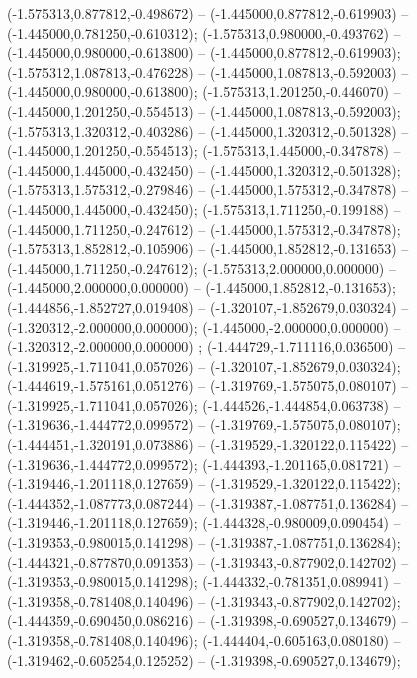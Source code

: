  (-1.575313,0.877812,-0.498672) -- (-1.445000,0.877812,-0.619903) -- (-1.445000,0.781250,-0.610312);
 (-1.575313,0.980000,-0.493762) -- (-1.445000,0.980000,-0.613800) -- (-1.445000,0.877812,-0.619903);
 (-1.575312,1.087813,-0.476228) -- (-1.445000,1.087813,-0.592003) -- (-1.445000,0.980000,-0.613800);
 (-1.575313,1.201250,-0.446070) -- (-1.445000,1.201250,-0.554513) -- (-1.445000,1.087813,-0.592003);
 (-1.575313,1.320312,-0.403286) -- (-1.445000,1.320312,-0.501328) -- (-1.445000,1.201250,-0.554513);
 (-1.575313,1.445000,-0.347878) -- (-1.445000,1.445000,-0.432450) -- (-1.445000,1.320312,-0.501328);
 (-1.575313,1.575312,-0.279846) -- (-1.445000,1.575312,-0.347878) -- (-1.445000,1.445000,-0.432450);
 (-1.575313,1.711250,-0.199188) -- (-1.445000,1.711250,-0.247612) -- (-1.445000,1.575312,-0.347878);
 (-1.575313,1.852812,-0.105906) -- (-1.445000,1.852812,-0.131653) -- (-1.445000,1.711250,-0.247612);
 (-1.575313,2.000000,0.000000) -- (-1.445000,2.000000,0.000000) -- (-1.445000,1.852812,-0.131653);
 (-1.444856,-1.852727,0.019408) -- (-1.320107,-1.852679,0.030324) -- (-1.320312,-2.000000,0.000000);
 (-1.445000,-2.000000,0.000000) -- (-1.320312,-2.000000,0.000000) ;
 (-1.444729,-1.711116,0.036500) -- (-1.319925,-1.711041,0.057026) -- (-1.320107,-1.852679,0.030324);
 (-1.444619,-1.575161,0.051276) -- (-1.319769,-1.575075,0.080107) -- (-1.319925,-1.711041,0.057026);
 (-1.444526,-1.444854,0.063738) -- (-1.319636,-1.444772,0.099572) -- (-1.319769,-1.575075,0.080107);
 (-1.444451,-1.320191,0.073886) -- (-1.319529,-1.320122,0.115422) -- (-1.319636,-1.444772,0.099572);
 (-1.444393,-1.201165,0.081721) -- (-1.319446,-1.201118,0.127659) -- (-1.319529,-1.320122,0.115422);
 (-1.444352,-1.087773,0.087244) -- (-1.319387,-1.087751,0.136284) -- (-1.319446,-1.201118,0.127659);
 (-1.444328,-0.980009,0.090454) -- (-1.319353,-0.980015,0.141298) -- (-1.319387,-1.087751,0.136284);
 (-1.444321,-0.877870,0.091353) -- (-1.319343,-0.877902,0.142702) -- (-1.319353,-0.980015,0.141298);
 (-1.444332,-0.781351,0.089941) -- (-1.319358,-0.781408,0.140496) -- (-1.319343,-0.877902,0.142702);
 (-1.444359,-0.690450,0.086216) -- (-1.319398,-0.690527,0.134679) -- (-1.319358,-0.781408,0.140496);
 (-1.444404,-0.605163,0.080180) -- (-1.319462,-0.605254,0.125252) -- (-1.319398,-0.690527,0.134679);
